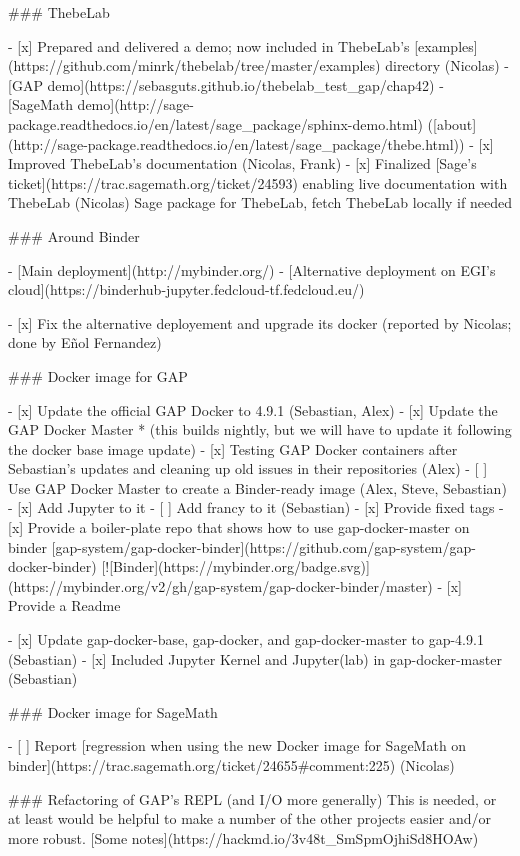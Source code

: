 \begin{Aim 1}
### ThebeLab

- [x] Prepared and delivered a demo; now included in ThebeLab's [examples](https://github.com/minrk/thebelab/tree/master/examples) directory (Nicolas)
- [GAP demo](https://sebasguts.github.io/thebelab_test_gap/chap42)
- [SageMath demo](http://sage-package.readthedocs.io/en/latest/sage_package/sphinx-demo.html) ([about](http://sage-package.readthedocs.io/en/latest/sage_package/thebe.html))
- [x] Improved ThebeLab's documentation (Nicolas, Frank) 
- [x] Finalized [Sage's ticket](https://trac.sagemath.org/ticket/24593) enabling live documentation with ThebeLab (Nicolas)
  Sage package for ThebeLab, fetch ThebeLab locally if needed

### Around Binder

- [Main deployment](http://mybinder.org/)
- [Alternative deployment on EGI's cloud](https://binderhub-jupyter.fedcloud-tf.fedcloud.eu/)

- [x] Fix the alternative deployement and upgrade its docker (reported by Nicolas; done by Eñol Fernandez)

### Docker image for GAP

- [x] Update the official GAP Docker to 4.9.1 (Sebastian, Alex)
- [x] Update the GAP Docker Master
         * (this builds nightly, but we will have to update it following the docker base image update)
- [x] Testing GAP Docker containers after Sebastian's updates and cleaning up old issues in their repositories (Alex)
- [ ] Use GAP Docker Master to create a Binder-ready image (Alex, Steve, Sebastian)
    - [x] Add Jupyter to it
    - [ ] Add francy to it (Sebastian)
    - [x] Provide fixed tags
    - [x] Provide a boiler-plate repo that shows how to use gap-docker-master on binder [gap-system/gap-docker-binder](https://github.com/gap-system/gap-docker-binder) [![Binder](https://mybinder.org/badge.svg)](https://mybinder.org/v2/gh/gap-system/gap-docker-binder/master)
    - [x] Provide a Readme

- [x] Update gap-docker-base, gap-docker, and gap-docker-master to gap-4.9.1 (Sebastian)
- [x] Included Jupyter Kernel and Jupyter(lab) in gap-docker-master (Sebastian)

### Docker image for SageMath

- [ ] Report [regression when using the new Docker image for SageMath on binder](https://trac.sagemath.org/ticket/24655#comment:225) (Nicolas)

### Refactoring of GAP's REPL (and I/O more generally)
This is needed, or at least would be helpful to make a number of the other projects easier and/or more robust.
[Some notes](https://hackmd.io/3v48t_SmSpmOjhiSd8HOAw)


\end{Aim 1}
